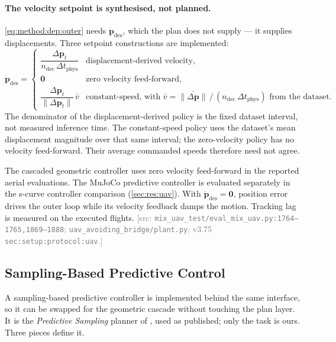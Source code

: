 \documentclass[headsepline,footsepline,footinclude=false,oneside,fontsize=11pt,paper=a4,listof=totoc,bibliography=totoc]{scrbook}
\theoremstyle{definition}
\theoremstyle{plain}
\theoremstyle{remark}
\newcommand{\vect}[1]{\boldsymbol{#1}}
\newcommand{\sidx}[1]{_{\textrm{#1}}}
\newif\ifsubmission
\newcommand{\srcnote}[1]{\ifsubmission\else\textcolor{gray}{\footnotesize\textsf{[src: #1]}}\fi}
\begin{document}
\paragraph{The velocity setpoint is synthesised, not planned.} \eqref{eq:method:dep:outer} needs
$\dot{\vect{p}}\sidx{des}$, which the plan does not supply --- it supplies displacements. Three
setpoint constructions are implemented:
\begin{equation}\label{eq:method:dep:vdes}
  \dot{\vect{p}}\sidx{des} =
  \begin{cases}
    \dfrac{\Delta\vect{p}_{t}}{n\sidx{dec}\,\Delta t\sidx{phys}} & \text{displacement-derived velocity,}\\
    \vect{0} & \text{zero velocity feed-forward,}\\
    \dfrac{\Delta\vect{p}_{t}}{\|\Delta\vect{p}_{t}\|}\,\bar{v} & \text{constant-speed, with }
      \bar{v} = \overline{\|\Delta\vect{p}\|}\,/\,(n\sidx{dec}\,\Delta t\sidx{phys})\text{ from the dataset.}
  \end{cases}
\end{equation}
The denominator of the displacement-derived policy is the fixed dataset interval, not measured
inference time. The constant-speed policy uses the dataset's mean displacement magnitude over that
same interval; the zero-velocity policy has no velocity feed-forward. Their average commanded
speeds therefore need not agree.

The cascaded geometric controller uses zero velocity feed-forward in the reported aerial evaluations.
The MuJoCo predictive controller is evaluated separately in the s-curve controller comparison
(\autoref{sec:res:uav}). With $\dot{\vect{p}}\sidx{des}=\vect{0}$, position error drives the outer
loop while its velocity feedback damps the motion. Tracking lag is measured on the executed flights.
\srcnote{\texttt{mix\_uav\_test/eval\_mix\_uav.py:1764--1765,1869--1888};
\texttt{uav\_avoiding\_bridge/plant.py}; v3.75 \texttt{sec:setup:protocol:uav}.}

\subsection{Sampling-Based Predictive Control}\label{sec:method:mjpc}

A sampling-based predictive controller is
implemented behind the same interface, so it can be swapped for the geometric cascade without
touching the plan layer. It is the \emph{Predictive Sampling} planner of \parencite{howell2022predictive}, used
as published; only the task is ours. Three pieces define it.
\end{document}
